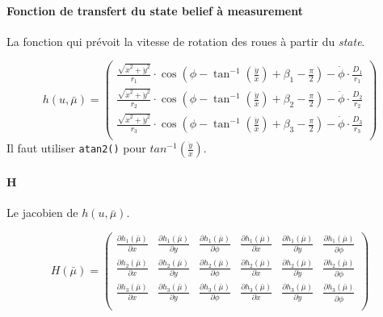 \documentclass[a4paper]{paper}
\begin{document}
\paragraph{Fonction de transfert du state belief à measurement}

La fonction qui prévoit la vitesse de rotation des roues à partir du \emph{state}.

\begin{equation}
    h \left(u, \bar{\mu}\right) =
    \left( \begin{array}{l}
        \frac{\sqrt{\dot{x}^2 + \dot{y}^2}}{r_1} \cdot \cos \left( \phi - \tan^{-1} \left(\frac{\dot{y}}{\dot{x}}\right) + \beta_1 - \frac{\pi}{2} \right)
            - \dot{\phi} \cdot \frac{D_1}{r_1} \\
        \frac{\sqrt{\dot{x}^2 + \dot{y}^2}}{r_2} \cdot \cos \left( \phi - \tan^{-1} \left(\frac{\dot{y}}{\dot{x}}\right) + \beta_2 - \frac{\pi}{2} \right)
            - \dot{\phi} \cdot \frac{D_2}{r_2} \\
        \frac{\sqrt{\dot{x}^2 + \dot{y}^2}}{r_3} \cdot \cos \left( \phi - \tan^{-1} \left(\frac{\dot{y}}{\dot{x}}\right) + \beta_3 - \frac{\pi}{2} \right)
            - \dot{\phi} \cdot \frac{D_3}{r_3} \\
    \end{array} \right)
    \label{h}
\end{equation}
Il faut utiliser \texttt{atan2()} pour $ tan^{-1} \left(\frac{\dot{y}}{\dot{x}} \right) $.


\paragraph{H}

Le jacobien de $ h\left(u, \bar{\mu}\right) $.

\begin{equation}
    H\left(\bar{\mu}\right) =
    \left( \begin{array}{cccccc}
        \frac{\partial h_1\left(\bar{\mu}\right)}{\partial x} & \frac{\partial h_1(\bar{\mu})}{\partial y} & \frac{\partial h_1(\bar{\mu})}{\partial \phi} &
        \frac{\partial h_1\left(\bar{\mu}\right)}{\partial \dot{x}} & \frac{\partial h_1(\bar{\mu})}{\partial \dot{y}} & \frac{\partial h_1(\bar{\mu})}{\partial \dot{\phi}}\\
        \frac{\partial h_2\left(\bar{\mu}\right)}{\partial x} & \frac{\partial h_2(\bar{\mu})}{\partial y} & \frac{\partial h_2(\bar{\mu})}{\partial \phi} &
        \frac{\partial h_2\left(\bar{\mu}\right)}{\partial \dot{x}} & \frac{\partial h_2(\bar{\mu})}{\partial \dot{y}} & \frac{\partial h_2(\bar{\mu})}{\partial \dot{\phi}}\\
        \frac{\partial h_3\left(\bar{\mu}\right)}{\partial x} & \frac{\partial h_3(\bar{\mu})}{\partial y} & \frac{\partial h_3(\bar{\mu})}{\partial \phi} &
        \frac{\partial h_3\left(\bar{\mu}\right)}{\partial \dot{x}} & \frac{\partial h_3(\bar{\mu})}{\partial \dot{y}} & \frac{\partial h_3(\bar{\mu})}{\partial \dot{\phi}}\\
    \end{array} \right)
    \label{}
\end{equation}
\end{document}

